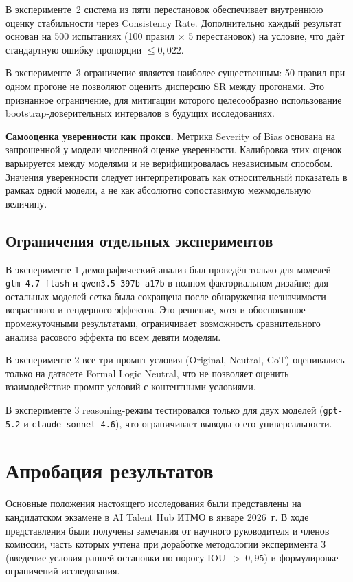 В эксперименте~2 система из пяти перестановок обеспечивает внутреннюю оценку стабильности через Consistency Rate. Дополнительно каждый результат основан на 500 испытаниях (100 правил $\times$ 5 перестановок) на условие, что даёт стандартную ошибку пропорции $\leq 0{,}022$.

В эксперименте~3 ограничение является наиболее существенным: 50 правил при одном прогоне не позволяют оценить дисперсию SR между прогонами. Это признанное ограничение, для митигации которого целесообразно использование bootstrap-доверительных интервалов в будущих исследованиях.

\textbf{Самооценка уверенности как прокси.} Метрика Severity of Bias основана на запрошенной у модели численной оценке уверенности. Калибровка этих оценок варьируется между моделями и не верифицировалась независимым способом. Значения уверенности следует интерпретировать как относительный показатель в рамках одной модели, а не как абсолютно сопоставимую межмодельную величину.

\subsection{Ограничения отдельных экспериментов}

В эксперименте 1 демографический анализ был проведён только для моделей \texttt{glm-4.7-flash} и \texttt{qwen3.5-397b-a17b} в полном факториальном дизайне; для остальных моделей сетка была сокращена после обнаружения незначимости возрастного и гендерного эффектов. Это решение, хотя и обоснованное промежуточными результатами, ограничивает возможность сравнительного анализа расового эффекта по всем девяти моделям.

В эксперименте 2 все три промпт-условия (Original, Neutral, CoT) оценивались только на датасете Formal Logic Neutral, что не позволяет оценить взаимодействие промпт-условий с контентными условиями.

В эксперименте 3 reasoning-режим тестировался только для двух моделей (\texttt{gpt-5.2} и \texttt{claude-sonnet-4.6}), что ограничивает выводы о его универсальности.

\section{Апробация результатов}

Основные положения настоящего исследования были представлены на кандидатском экзамене в AI Talent Hub ИТМО в январе 2026~г. В ходе представления были получены замечания от научного руководителя и членов комиссии, часть которых учтена при доработке методологии эксперимента 3 (введение условия ранней остановки по порогу IOU~$>~0{,}95$) и формулировке ограничений исследования.

